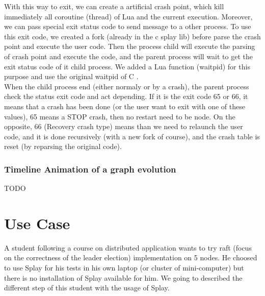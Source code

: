 \documentclass{eplmastersthesis}
\begin{document}
        With this way to exit, we can create a artificial crash point, which kill immediately all coroutine (thread)
        of Lua and the current execution. Moreover, we can pass special exit status code to send message to a other process.
        To use this exit code, we created a fork (already in the c splay lib) before parse the crash point and execute the user code.
        Then the process child will execute the parsing of crash point and execute the code, and the parent process will wait
        to get the exit status code of it child process. We added a Lua function (waitpid) for this purpose and use the
        original waitpid of C \cite{waitpid}. \\

        When the child process end (either normaly or by a crash), the parent process check the status exit code and act depending.
        If it is the exit code 65 or 66, it means that a crash has been done (or the user want to exit with one of these values),
        65 means a STOP crash, then no restart need to be node. On the opposite, 66 (Recovery crash type) means than we need to
        relaunch the user code,
        and it is done recursively (with a new fork of course), and the crash table is reset (by reparsing the original code).

      \subsection{Timeline Animation of a graph evolution}
      {\color{red} TODO}


  \chapter{Use Case}
    A student following a course on distributed application wants to try raft (focus on the correctness of the leader election)
    implementation on 5 nodes.
    He choosed to use Splay for his tests in his own laptop (or cluster of mini-computer) but there
    is no installation of Splay available for him.
    We going to described the different step of this student with the usage of Splay.
\end{document}
